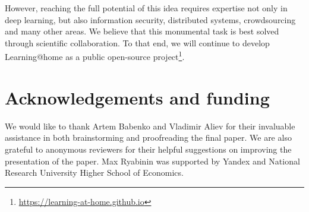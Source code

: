 \documentclass{article}
\begin{document}
However, reaching the full potential of this idea requires expertise not only in deep learning, but also information security, distributed systems, crowdsourcing and many other areas. We believe that this monumental task is best solved through scientific collaboration. To that end, we will continue to develop Learning@home as a public open-source project\footnote{\url{https://learning-at-home.github.io}}.

\section*{Acknowledgements and funding}
We would like to thank Artem Babenko and Vladimir Aliev for their invaluable assistance in both brainstorming and proofreading the final paper. We are also grateful to anonymous reviewers for their helpful suggestions on improving the presentation of the paper. Max Ryabinin was supported by Yandex and National Research University Higher School of Economics.




\nocite{paszke2019pytorch}



\appendix

\end{document}
